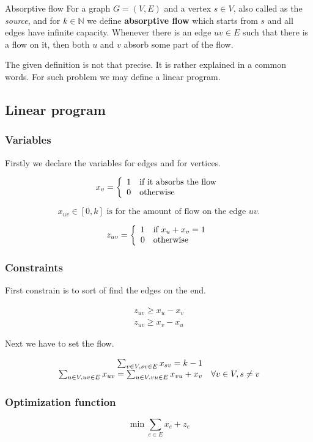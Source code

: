 \documentclass{article}
\begin{document}
	\begin{defn}{Absorptive flow}
		For a graph $G = (V,E)$ and a vertex $s \in V$, also called as the \textit{source}, and for $k \in \mathbb{N}$ we define \textbf{absorptive flow} which starts from $s$ and all edges have infinite capacity. Whenever there is an edge $uv \in E$ such that there is a flow on it, then both $u$ and $v$ absorb some part of the flow.
	\end{defn}

	The given definition is not that precise. It is rather explained in a common words. For such problem we may define a linear program.


	\subsection{Linear program}
	
	\subsubsection{Variables}
	
	Firstly we declare the variables for edges and for vertices.
	
	$$
	x_v = \left\{\begin{array}{l l}
		1 & \text{if it absorbs the flow} \\
		0 & \text{otherwise}
	\end{array}
	\right.
	$$
	
	$$
	x_{uv} \in [0,k] \text{ is for the amount of flow on the edge } uv.
	$$
	
	$$
	z_{uv} = \left\{\begin{array}{l l}
		1 & \text{if } x_u + x_v = 1 \\
		0 & \text{otherwise}
	\end{array}
	\right.
	$$
	
	\subsubsection{Constraints}
	
	First constrain is to sort of find the edges on the end.
	
	$$
	\begin{array}{c}
		z_{uv} \geq x_u - x_v \\
		z_{uv} \geq x_v - x_u
	\end{array}
	$$
	
	Next we have to set the flow.
	
	$$
	\begin{array}{r l}
		\sum_{v \in V, sv \in E} x_{sv} = k-1 \\
		\sum_{u \in V, uv \in E} x_{uv} = \sum_{u \in V, vu \in E} x_{vu} + x_v & \forall v \in V, s \neq v
	\end{array}
	$$
	
	\subsubsection{Optimization function}
	
	$$
	\min \sum_{e \in E} x_e + z_e
	$$
\end{document}
